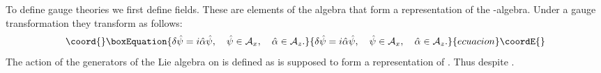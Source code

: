 \documentclass[a4paper,11pt]{article}
\def\Ax{{\mathcal{A}_x}}
\def\Az{{\mathcal{A}_z}}
\begin{document}
To define gauge theories we first define fields. These are
elements of the algebra \myHighlight{$\Ax$}\coordHE{} that form a representation of the
\coordHE{}-algebra. Under a  gauge transformation they transform as
follows:
\begin{equation}\coord{}\boxEquation{
\label{gaugetrafo}
  \delta\hat{\psi}=i\hat{\alpha}\hat{\psi},\quad \hat{\psi}\in\Ax,\quad \hat{\alpha}\in\Az.
}{
\delta\hat{\psi}=i\hat{\alpha}\hat{\psi},\quad \hat{\psi}\in\Ax,\quad \hat{\alpha}\in\Az.
}{ecuacion}\coordE{}\end{equation}
The action of the generators \coordHE{} of the Lie algebra on 
\myHighlight{$\hat{\psi}$}\coordHE{} is defined as \myHighlight{$\hat{\psi}$}\coordHE{} is supposed to form a representation of \coordHE{}.
Thus \myHighlight{$\delta\hat{\psi}\in\Ax$}\coordHE{} despite \myHighlight{$\hat{\alpha}\in\Az$}\coordHE{}.
\end{document}
